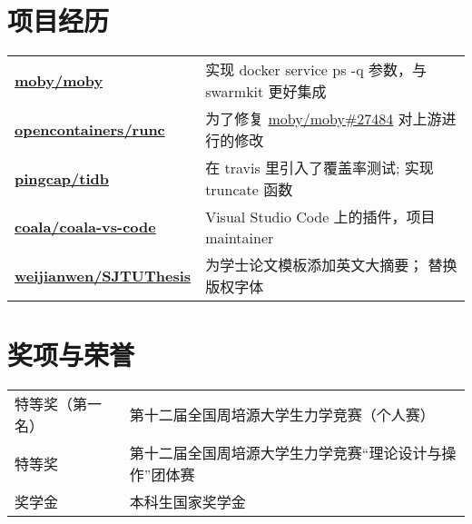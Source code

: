 \documentclass[]{deedy-resume-openfont}
\begin{document}
\begin{minipage}[t]{0.73\textwidth}

\section{项目经历}
\begin{tabular}{ll}
\href{https://github.com/moby/moby/commits?author=gaocegege}{\bf moby/moby} & 实现 docker service ps -q 参数，与 swarmkit 更好集成 \\
\href{https://github.com/opencontainers/runc/commits?author=gaocegege}{\bf opencontainers/runc} & 为了修复 \href{https://github.com/moby/moby/issues/27484}{moby/moby\#27484} 对上游进行的修改 \\
\href{https://github.com/pingcap/tidb/commits?author=gaocegege}{\bf pingcap/tidb} & 在 travis 里引入了覆盖率测试; 实现 truncate 函数 \\
\href{https://github.com/coala/coala-vs-code/commits/master?author=gaocegege}{\bf coala/coala-vs-code} & Visual Studio Code 上的插件，项目 maintainer \\
\href{https://github.com/weijianwen/SJTUThesis/commits?author=gaocegege}{\bf weijianwen/SJTUThesis} & 为学士论文模板添加英文大摘要； 替换版权字体 \\
\end{tabular}
\sectionsep


\section{奖项与荣誉} 
\begin{tabular}{ll}
特等奖（第一名） & 第十二届全国周培源大学生力学竞赛（个人赛）\\
特等奖 & 第十二届全国周培源大学生力学竞赛“理论设计与操作”团体赛\\
奖学金 & 本科生国家奖学金 \\
\end{tabular}
\sectionsep


% 
% 

\end{minipage} 
\end{document}
